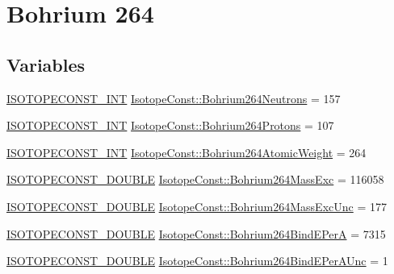 \hypertarget{group___isotope_const-_bohrium-_bh264}{}\section{Bohrium 264}
\label{group___isotope_const-_bohrium-_bh264}
\subsection*{Variables}
\begin{DoxyCompactItemize}
\item 
\mbox{\hyperlink{group___isotope_const-_macros_ga5f18360b3e99483a35c32d789e62621c}{I\+S\+O\+T\+O\+P\+E\+C\+O\+N\+S\+T\+\_\+\+I\+NT}} \mbox{\hyperlink{group___isotope_const-_bohrium-_bh264_ga78f24bcb7a7cfa561f3cc8b79a583b63}{Isotope\+Const\+::\+Bohrium264\+Neutrons}} = 157
\item 
\mbox{\hyperlink{group___isotope_const-_macros_ga5f18360b3e99483a35c32d789e62621c}{I\+S\+O\+T\+O\+P\+E\+C\+O\+N\+S\+T\+\_\+\+I\+NT}} \mbox{\hyperlink{group___isotope_const-_bohrium-_bh264_ga9d45eac1e88128430ca02c84cdc0e809}{Isotope\+Const\+::\+Bohrium264\+Protons}} = 107
\item 
\mbox{\hyperlink{group___isotope_const-_macros_ga5f18360b3e99483a35c32d789e62621c}{I\+S\+O\+T\+O\+P\+E\+C\+O\+N\+S\+T\+\_\+\+I\+NT}} \mbox{\hyperlink{group___isotope_const-_bohrium-_bh264_ga1a2169775dbad85f95473773f2a0decd}{Isotope\+Const\+::\+Bohrium264\+Atomic\+Weight}} = 264
\item 
\mbox{\hyperlink{group___isotope_const-_macros_ga8f45a7272ce02c0b4c65c44636ed719a}{I\+S\+O\+T\+O\+P\+E\+C\+O\+N\+S\+T\+\_\+\+D\+O\+U\+B\+LE}} \mbox{\hyperlink{group___isotope_const-_bohrium-_bh264_ga9a4954c321d7eeffa6f015b90d7bfa66}{Isotope\+Const\+::\+Bohrium264\+Mass\+Exc}} = 116058
\item 
\mbox{\hyperlink{group___isotope_const-_macros_ga8f45a7272ce02c0b4c65c44636ed719a}{I\+S\+O\+T\+O\+P\+E\+C\+O\+N\+S\+T\+\_\+\+D\+O\+U\+B\+LE}} \mbox{\hyperlink{group___isotope_const-_bohrium-_bh264_ga4269a442b54adf7a16961921be655c3f}{Isotope\+Const\+::\+Bohrium264\+Mass\+Exc\+Unc}} = 177
\item 
\mbox{\hyperlink{group___isotope_const-_macros_ga8f45a7272ce02c0b4c65c44636ed719a}{I\+S\+O\+T\+O\+P\+E\+C\+O\+N\+S\+T\+\_\+\+D\+O\+U\+B\+LE}} \mbox{\hyperlink{group___isotope_const-_bohrium-_bh264_ga6237c62d35afa93b28a9677b69a4cbef}{Isotope\+Const\+::\+Bohrium264\+Bind\+E\+PerA}} = 7315
\item 
\mbox{\hyperlink{group___isotope_const-_macros_ga8f45a7272ce02c0b4c65c44636ed719a}{I\+S\+O\+T\+O\+P\+E\+C\+O\+N\+S\+T\+\_\+\+D\+O\+U\+B\+LE}} \mbox{\hyperlink{group___isotope_const-_bohrium-_bh264_ga00219cf01596cdb46f6ae52f755697e6}{Isotope\+Const\+::\+Bohrium264\+Bind\+E\+Per\+A\+Unc}} = 1

\end{DoxyCompactItemize}
